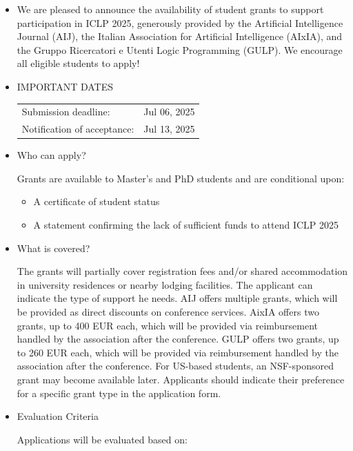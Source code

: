 \documentclass[prodmode,acmtecs]{acmsmall} %
\begin{document}
\begin{itemize}\item  We are pleased to announce the availability of student grants to support participation in ICLP 2025, generously provided by the Artificial Intelligence Journal (AIJ), the Italian Association for Artificial Intelligence (AIxIA), and the Gruppo Ricercatori e Utenti Logic Programming (GULP). We encourage all eligible students to apply! 
 
\item  IMPORTANT DATES 
 
\begin{tabulary}{\linewidth}{LL}Submission deadline:  & Jul 06, 2025 \\
Notification of acceptance:  & Jul 13, 2025 \\
\end{tabulary}
 
\item  Who can apply? 
 
  Grants are available to Master’s and PhD students and are conditional upon: 
 
\begin{itemize}\item  A certificate of student status
\item  A statement confirming the lack of sufficient funds to attend ICLP 2025
\end{itemize} 
\item  What is covered? 
 
  The grants will partially cover registration fees and/or shared accommodation in university residences or nearby lodging facilities. The applicant can indicate the type of support he needs. AIJ offers multiple grants, which will be provided as direct discounts on conference services. AixIA offers two grants, up to 400 EUR each, which will be provided via reimbursement handled by the association after the conference.  GULP offers two grants, up to 260 EUR each, which will be provided via reimbursement handled by the association after the conference. For US-based students, an NSF-sponsored grant may become available later. Applicants should indicate their preference for a specific grant type in the application form. 
 
\item  Evaluation Criteria 
 
  Applications will be evaluated based on: 
 

\end{itemize}
\end{document}
